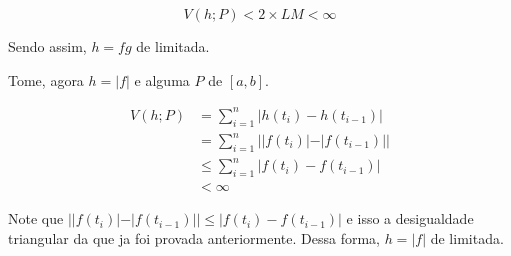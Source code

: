 $$
V(h;P) < 2\times LM < \infty
$$

Sendo assim, $h = fg$ \eh de \variacao limitada. 

Tome, agora $h=|f|$ e alguma \particao $P$ de $[a,b]$.

\begin{align*}
		V(h;P) &= \sum_{i = 1}^n|h(t_i) - h(t_{i-1})| \\
		&= \sum_{i = 1}^n||f(t_i)| - |f(t_{i-1})|| \\
		&\leq \sum_{i = 1}^n|f(t_i) - f(t_{i-1})| \\
		&< \infty
\end{align*}

Note que $||f(t_i)| - |f(t_{i-1})|| \leq |f(t_i) - f(t_{i-1})| $ e isso \eh a desigualdade triangular da \subtracao que ja foi provada anteriormente. Dessa forma, $h = |f|$ \eh de \variacao limitada. 







